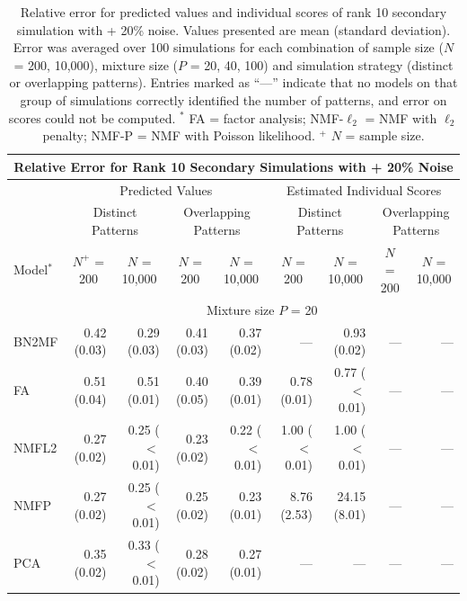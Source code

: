 \clearpage
\begin{landscape}
\begingroup
\renewcommand{\arraystretch}{1.2}
\begin{table}[!htbp] \centering 
  \caption{\small Relative error for predicted values and individual scores of rank 10 secondary simulation with + 20\% noise. Values presented are mean (standard deviation). Error was averaged over 100 simulations for each combination of sample size ($N$ = 200, 10,000), mixture size ($P$ = 20, 40, 100) and simulation strategy (distinct or overlapping patterns). Entries marked as ``---'' indicate that no models on that group of simulations correctly identified the number of patterns, and error on scores could not be computed. $^*$ FA = factor analysis; NMF-$\ell_2$ = NMF with $\ell_2$ penalty; NMF-P = NMF with Poisson likelihood. $^+$ $N$ = sample size.} 
  \label{table:sup10} 
 \addtolength{\tabcolsep}{-2pt}
\small
\begin{tabular}{lrr|rr|rr|rr}
\multicolumn{9}{c}{Relative Error for Rank 10 Secondary Simulations with + 20\% Noise} \\
\hline 
\hline  
& \multicolumn{4}{c}{Predicted Values} & \multicolumn{4}{c}{Estimated Individual Scores} \\
\hline
\hline
& \multicolumn{2}{c}{Distinct Patterns} & \multicolumn{2}{c}{Overlapping Patterns} & \multicolumn{2}{c}{Distinct Patterns} & \multicolumn{2}{c}{Overlapping Patterns} \\
\hline
\hline  
Model$^*$ & \multicolumn{1}{c}{$N^+$ = 200} & \multicolumn{1}{c}{$N$ = 10,000} & \multicolumn{1}{c}{$N$ = 200} & \multicolumn{1}{c}{$N$ = 10,000} & \multicolumn{1}{c}{$N$ = 200} & \multicolumn{1}{c}{$N$ = 10,000} & \multicolumn{1}{c}{$N$ = 200} & \multicolumn{1}{c}{$N$ = 10,000} \\
\hline
\hline  
& \multicolumn{8}{c}{Mixture size $P$ = 20} \\
\hline
BN2MF & 0.42 (0.03) & 0.29 (0.03) & 0.41 (0.03) & 0.37 (0.02) & --- & 0.93 (0.02) & --- & --- \\ 
FA & 0.51 (0.04) & 0.51 (0.01) & 0.40 (0.05) & 0.39 (0.01) & 0.78 (0.01) & 0.77 ($<$0.01) & --- & --- \\ 
NMFL2 & 0.27 (0.02) & 0.25 ($<$0.01) & 0.23 (0.02) & 0.22 ($<$0.01) & 1.00 ($<$0.01) & 1.00 ($<$0.01) & --- & --- \\ 
NMFP & 0.27 (0.02) & 0.25 ($<$0.01) & 0.25 (0.02) & 0.23 (0.01) & 8.76 (2.53) & 24.15 (8.01) & --- & --- \\ 
PCA & 0.35 (0.02) & 0.33 ($<$0.01) & 0.28 (0.02) & 0.27 (0.01) & --- & --- & --- & --- \\ 

\end{tabular}
\end{table}
\end{landscape}
